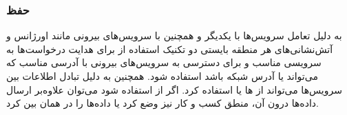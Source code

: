\subsubsection*{حفظ }

به دلیل تعامل سرویس‌ها با یکدیگر و همچنین با سرویس‌های بیرونی مانند اورژانس و
آتش‌نشانی‌های هر منطقه بایستی دو تکنیک استفاده از  برای هدایت
درخواست‌ها به سرویسی مناسب و  برای دسترسی به سرویس‌های بیرونی با
آدرسی مناسب که می‌تواند  یا آدرس شبکه باشد استفاده شود. همچنین به دلیل
تبادل اطلاعات بین سرویس‌ها می‌تواند از ها یا  استفاده کرد. اگر
از  استفاده شود می‌توان علاوه‌بر ارسال داده‌ها درون آن، منطق کسب و کار
نیز وضع کرد یا داده‌ها را در همان بین  کرد.